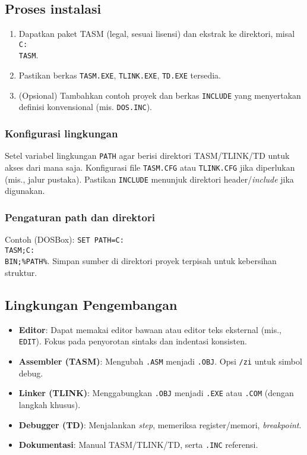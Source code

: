 \subsection{Proses instalasi}
\begin{enumerate}
  \item Dapatkan paket TASM (legal, sesuai lisensi) dan ekstrak ke direktori, misal \texttt{C:\\TASM}.
  \item Pastikan berkas \texttt{TASM.EXE}, \texttt{TLINK.EXE}, \texttt{TD.EXE} tersedia.
  \item (Opsional) Tambahkan contoh proyek dan berkas \texttt{INCLUDE} yang menyertakan definisi konvensional (mis. \texttt{DOS.INC}).
\end{enumerate}

\subsubsection{Konfigurasi lingkungan}
Setel variabel lingkungan \texttt{PATH} agar berisi direktori TASM/TLINK/TD untuk akses dari mana saja. Konfigurasi file \texttt{TASM.CFG} atau \texttt{TLINK.CFG} jika diperlukan (mis., jalur pustaka). Pastikan \texttt{INCLUDE} menunjuk direktori header/\textit{include} jika digunakan.

\subsubsection{Pengaturan path dan direktori}
Contoh (DOSBox): \texttt{SET PATH=C:\\TASM;C:\\BIN;\%PATH\%}. Simpan sumber di direktori proyek terpisah untuk kebersihan struktur.

\subsection{Lingkungan Pengembangan}
\begin{itemize}
  \item \textbf{Editor}: Dapat memakai editor bawaan atau editor teks eksternal (mis., \texttt{EDIT}). Fokus pada penyorotan sintaks dan indentasi konsisten.
  \item \textbf{Assembler (TASM)}: Mengubah \texttt{.ASM} menjadi \texttt{.OBJ}. Opsi \texttt{/zi} untuk simbol debug.
  \item \textbf{Linker (TLINK)}: Menggabungkan \texttt{.OBJ} menjadi \texttt{.EXE} atau \texttt{.COM} (dengan langkah khusus).
  \item \textbf{Debugger (TD)}: Menjalankan \textit{step}, memeriksa register/memori, \textit{breakpoint}.
  \item \textbf{Dokumentasi}: Manual TASM/TLINK/TD, serta \texttt{.INC} referensi.
\end{itemize}

